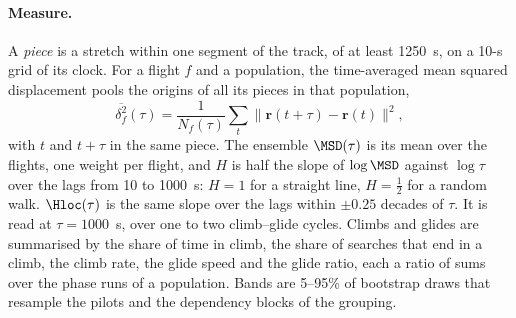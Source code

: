 \paragraph{Measure.} A \emph{piece} is a stretch within one segment of the track, of at least
1250~s, on a 10-s grid of its clock. For a flight $f$ and a population, the time-averaged mean
squared displacement pools the origins of all its pieces in that population,
\begin{equation}\label{eq:tamsd}
  \overline{\delta^2_f}(\tau)=\frac{1}{N_f(\tau)}\sum_{t}\bigl\|\mathbf r(t+\tau)-\mathbf r(t)\bigr\|^2 ,
\end{equation}
with $t$ and $t+\tau$ in the same piece. The ensemble $\MSD(\tau)$ is its mean over the flights, one
weight per flight, and $H$ is half the slope of $\log\MSD$ against $\log\tau$ over the lags from 10 to
1000~s: $H=1$ for a straight line, $H=\tfrac12$ for a random walk. $\Hloc(\tau)$ is the same slope over the
lags within $\pm0.25$ decades of $\tau$. It is read at $\tau=1000$~s, over one to two climb--glide cycles. Climbs and glides are summarised by the share of
time in climb, the share of searches that end in a climb, the climb rate, the glide speed and the
glide ratio, each a ratio of sums over the phase runs of a population. Bands are 5--95\% of bootstrap
draws that resample the pilots and the dependency blocks of the grouping.
